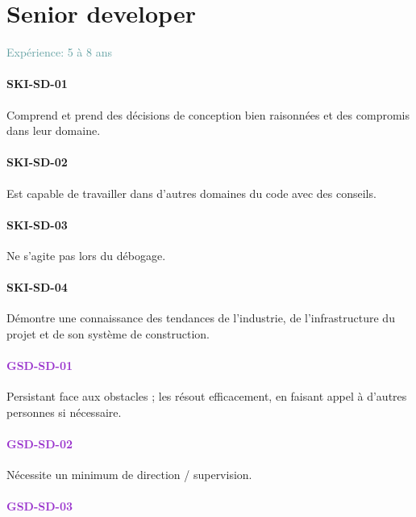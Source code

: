 \documentclass[a4paper, french, openany, 12pt]{book}
\newcommand\dex[1]{\textcolor{BrickRed}{\textbf{\uppercase{ski-{#1}}}}}
\newcommand\str[1]{\textcolor{DarkOrchid}{\textbf{\uppercase{gsd-{#1}}}}}
\newcommand\xp[1]{\textcolor{CadetBlue}{Expérience: {#1} ans}}
\begin{document}
\chapter{Senior developer}

\xp{5 à 8}

\begin{multicols}{2}

  \subsubsection*{\dex{sd-01}}

  Comprend et prend des décisions de conception bien raisonnées et des compromis dans leur domaine.

  \subsubsection*{\dex{sd-02}}

  Est capable de travailler dans d'autres domaines du code avec des conseils.

  \subsubsection*{\dex{sd-03}}

  Ne s'agite pas lors du débogage.

  \subsubsection*{\dex{sd-04}}

  Démontre une connaissance des tendances de l'industrie, de l'infrastructure du projet et de son système de construction.

  \subsubsection*{\str{sd-01}}

  Persistant face aux obstacles ; les résout efficacement, en faisant appel à d'autres personnes si nécessaire. 

  \subsubsection*{\str{sd-02}}

  Nécessite un minimum de direction / supervision.

  \subsubsection*{\str{sd-03}}


\end{multicols}
\end{document}

